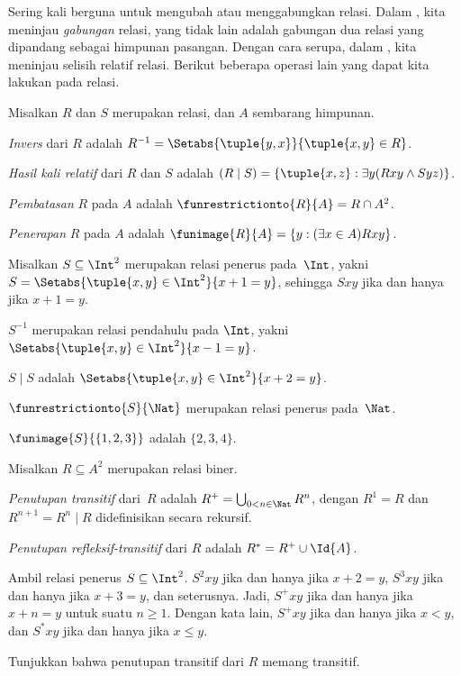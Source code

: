 \documentclass[../../../include/open-logic-section]{subfiles}
\begin{document}

Sering kali berguna untuk mengubah atau menggabungkan relasi. Dalam
, kita meninjau \emph{gabungan}
relasi, yang tidak lain adalah gabungan dua relasi yang dipandang sebagai
himpunan pasangan. Dengan cara serupa, dalam
, kita meninjau selisih relatif
relasi. Berikut beberapa operasi lain yang dapat kita lakukan pada relasi.

\begin{defn}
Misalkan $R$ dan $S$ merupakan relasi, dan $A$ sembarang himpunan.

\emph{Invers} dari $R$ adalah $R^{-1} = \Setabs{\tuple{y, x}}{\tuple{x,
    y} \in R}$.

\emph{Hasil kali relatif} dari $R$ dan $S$ adalah $(R \mid S) =
\{\tuple{x, z} : \exists y(Rxy \land Syz)\}$.

\emph{Pembatasan} $R$ pada $A$ adalah $\funrestrictionto{R}{A}= R
\cap A^2$.

\emph{Penerapan} $R$ pada $A$ adalah $\funimage{R}{A} = \{y :
(\exists x \in A)Rxy\}$.
\end{defn}

\begin{ex}
Misalkan $S \subseteq \Int^2$ merupakan relasi penerus pada~$\Int$, yakni
$S = \Setabs{\tuple{x, y} \in \Int^2}{x + 1 = y}$, sehingga $Sxy$ jika dan
hanya jika $x + 1 = y$.

$S^{-1}$ merupakan relasi pendahulu pada $\Int$, yakni
$\Setabs{\tuple{x,y}\in\Int^2}{x -1 =y}$.

$S\mid S$ adalah
$ \Setabs{\tuple{x,y}\in\Int^2}{x + 2 =y}$.

$\funrestrictionto{S}{\Nat}$ merupakan relasi penerus pada~$\Nat$.

$\funimage{S}{\{1,2,3\}}$ adalah $\{2, 3, 4\}$.
\end{ex}

\begin{defn}Misalkan $R \subseteq A^2$ merupakan relasi
biner.

\emph{Penutupan transitif} dari~$R$ adalah $R^+ = \bigcup_{0 < n \in
\Nat} R^n$, dengan $R^1 = R$ dan $R^{n+1} = R^n \mid R$ didefinisikan secara
rekursif.

\emph{Penutupan refleksif-transitif} dari $R$ adalah
$R^* = R^+ \cup \Id{A}$.
\end{defn}

\begin{ex}
Ambil relasi penerus $S \subseteq \Int^2$. $S^2xy$ jika dan hanya jika
$x + 2 = y$, $S^3xy$ jika dan hanya jika $x + 3 = y$, dan seterusnya. Jadi,
$S^+xy$ jika dan hanya jika $x + n = y$ untuk suatu $n \geq 1$. Dengan kata
lain, $S^+xy$ jika dan hanya jika $x < y$, dan $S^*xy$ jika dan hanya jika
$x \le y$.
\end{ex}

\begin{prob}
Tunjukkan bahwa penutupan transitif dari $R$ memang transitif.
\end{prob}
\end{document}
